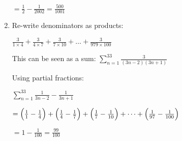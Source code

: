 \documentclass[../main.tex]{subfiles}
\begin{document}
\begin{enumerate}[itemsep=0.7cm]
    $=\frac{1}{2}-\frac{1}{2002}=\frac{500}{1001}$

    \item 
    Re-write denominators as products:

    $\frac{3}{1\times 4}+\frac{3}{4\times 7}+\frac{3}{7\times 10}+\dots +\frac{3}{979\times 100}$

    This can be seen as a sum:
    $\sum\limits_{n=1}^{33} \frac{3}{(3n-2)(3n+1)}$

    Using partial fractions:

    $\sum\limits_{n=1}^{33} \frac{1}{3n-2}-\frac{1}{3n+1}$

    $=\Bigl(\frac{1}{1}-\frac{1}{4}\Bigr)+\Bigl(\frac{1}{4}-\frac{1}{7}\Bigr)+\Bigl(\frac{1}{7}-\frac{1}{10}\Bigr)+\dots +\Bigl(\frac{1}{97}-\frac{1}{100}\Bigr)$

    $=1-\frac{1}{100}=\frac{99}{100}$


\end{enumerate}
\end{document}
